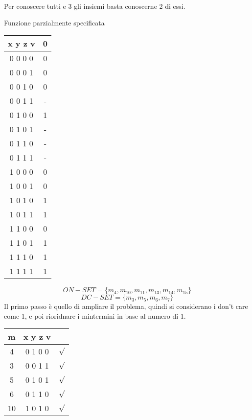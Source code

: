 \documentclass[a4paper]{article}
\theoremstyle{break}
\theoremstyle{break}
\theoremstyle{break}
\theoremstyle{break}
\begin{document}
Per conoscere tutti e 3 gli insiemi basta conoscerne 2 di essi.
\begin{example}
    Funzione parzialmente specificata
        \begin{center}
            \begin{tabular}{c|c}
                x y z v & 0\\
                \hline
                0 0 0 0 & 0\\
                0 0 0 1 & 0\\
                0 0 1 0 & 0\\
                0 0 1 1 & -\\
                0 1 0 0 & 1\\
                0 1 0 1 & -\\
                0 1 1 0 & -\\
                0 1 1 1 & -\\
                1 0 0 0 & 0\\
                1 0 0 1 & 0\\
                1 0 1 0 & 1\\
                1 0 1 1 & 1\\
                1 1 0 0 & 0\\
                1 1 0 1 & 1\\
                1 1 1 0 & 1\\
                1 1 1 1 & 1\\
            \end{tabular}
        \end{center}
        \[ON-SET = \{ m_4,m_{10},m_{11},m_{13},m_{14},m_{15} \} \]
        \[
        DC-SET = \{ m_3,m_5,m_6,m_7 \}
        \] 
        Il primo passo è quello di ampliare il problema, quindi si considerano i
        don't care come 1, e poi rioridnare i mintermini in base al numero di 1.
        \begin{center}
            \begin{tabular}{c|c|c}
                m & x y z v &\\
                \hline
                4 & 0 1 0 0 & \( \surd \) \\
                \hline
                3 & 0 0 1 1 &\( \surd \) \\
                5 & 0 1 0 1 &\( \surd \) \\
                6 & 0 1 1 0 &\( \surd \) \\
                10 & 1 0 1 0&\( \surd \) \\

\end{tabular}
\end{center}
\end{example}
\end{document}
